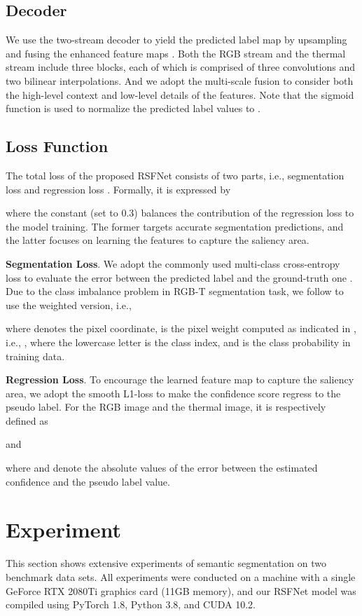 \documentclass[10.5pt,twocolumn,journal,letterpaper]{IEEEtran}
\newcommand{\ie}{i.e.}
\begin{document}
\subsection{Decoder}
We use the two-stream decoder to yield the predicted label map  by upsampling and fusing the enhanced feature maps . Both the RGB stream and the thermal stream include three blocks, each of which is comprised of three  convolutions and two bilinear interpolations. And we adopt the multi-scale fusion \cite{chen-tip2020-dpanet} to consider both the high-level context and low-level details of the features. Note that the sigmoid function is used to normalize the predicted label values to .


\subsection{Loss Function}
The total loss  of the proposed RSFNet consists of two parts, \ie, segmentation loss  and regression loss . Formally, it is expressed by

where the constant  (set to 0.3) balances the contribution of the regression loss to the model training. The former targets accurate segmentation predictions, and the latter focuses on learning the features to capture the saliency area.

\textbf{Segmentation Loss}. We adopt the commonly used multi-class cross-entropy loss to evaluate the error between the predicted label  and the ground-truth one . Due to the class imbalance problem in RGB-T segmentation task, we follow \cite{ha-iros2017-mfnet} to use the weighted version, \ie,

where  denotes the pixel coordinate,  is the pixel weight computed as indicated in \cite{paszke-arxiv2016-enet}, \ie, , where the lowercase letter  is the class index, and  is the class probability in training data.

\textbf{Regression Loss}. To encourage the learned feature map to capture the saliency area, we adopt the smooth L1-loss \cite{girshick-iccv2015-rcnn} to make the confidence score regress to the pseudo label. For the RGB image and the thermal image, it is respectively defined as

and

where  and  denote the absolute values of the error between the estimated confidence and the pseudo label value.


\section{Experiment}
\label{test}
This section shows extensive experiments of semantic segmentation on two benchmark data sets. All experiments were conducted on a machine with a single GeForce RTX 2080Ti graphics card (11GB memory), and our RSFNet model was compiled using PyTorch 1.8, Python 3.8, and CUDA 10.2.
\end{document}
